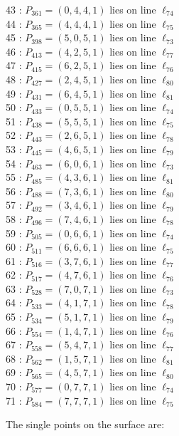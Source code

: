 \documentclass{article}
\begin{document}
{\begin{multicols}{2}
43 : $P_{361}=( 0, 4, 4, 1 )$ lies on line $\ell_{74}$\\
44 : $P_{365}=( 4, 4, 4, 1 )$ lies on line $\ell_{75}$\\
45 : $P_{398}=( 5, 0, 5, 1 )$ lies on line $\ell_{73}$\\
46 : $P_{413}=( 4, 2, 5, 1 )$ lies on line $\ell_{77}$\\
47 : $P_{415}=( 6, 2, 5, 1 )$ lies on line $\ell_{76}$\\
48 : $P_{427}=( 2, 4, 5, 1 )$ lies on line $\ell_{80}$\\
49 : $P_{431}=( 6, 4, 5, 1 )$ lies on line $\ell_{81}$\\
50 : $P_{433}=( 0, 5, 5, 1 )$ lies on line $\ell_{74}$\\
51 : $P_{438}=( 5, 5, 5, 1 )$ lies on line $\ell_{75}$\\
52 : $P_{443}=( 2, 6, 5, 1 )$ lies on line $\ell_{78}$\\
53 : $P_{445}=( 4, 6, 5, 1 )$ lies on line $\ell_{79}$\\
54 : $P_{463}=( 6, 0, 6, 1 )$ lies on line $\ell_{73}$\\
55 : $P_{485}=( 4, 3, 6, 1 )$ lies on line $\ell_{81}$\\
56 : $P_{488}=( 7, 3, 6, 1 )$ lies on line $\ell_{80}$\\
57 : $P_{492}=( 3, 4, 6, 1 )$ lies on line $\ell_{79}$\\
58 : $P_{496}=( 7, 4, 6, 1 )$ lies on line $\ell_{78}$\\
59 : $P_{505}=( 0, 6, 6, 1 )$ lies on line $\ell_{74}$\\
60 : $P_{511}=( 6, 6, 6, 1 )$ lies on line $\ell_{75}$\\
61 : $P_{516}=( 3, 7, 6, 1 )$ lies on line $\ell_{77}$\\
62 : $P_{517}=( 4, 7, 6, 1 )$ lies on line $\ell_{76}$\\
63 : $P_{528}=( 7, 0, 7, 1 )$ lies on line $\ell_{73}$\\
64 : $P_{533}=( 4, 1, 7, 1 )$ lies on line $\ell_{78}$\\
65 : $P_{534}=( 5, 1, 7, 1 )$ lies on line $\ell_{79}$\\
66 : $P_{554}=( 1, 4, 7, 1 )$ lies on line $\ell_{76}$\\
67 : $P_{558}=( 5, 4, 7, 1 )$ lies on line $\ell_{77}$\\
68 : $P_{562}=( 1, 5, 7, 1 )$ lies on line $\ell_{81}$\\
69 : $P_{565}=( 4, 5, 7, 1 )$ lies on line $\ell_{80}$\\
70 : $P_{577}=( 0, 7, 7, 1 )$ lies on line $\ell_{74}$\\
71 : $P_{584}=( 7, 7, 7, 1 )$ lies on line $\ell_{75}$\\
\end{multicols}
The single points on the surface are:\\
}
\end{document}
